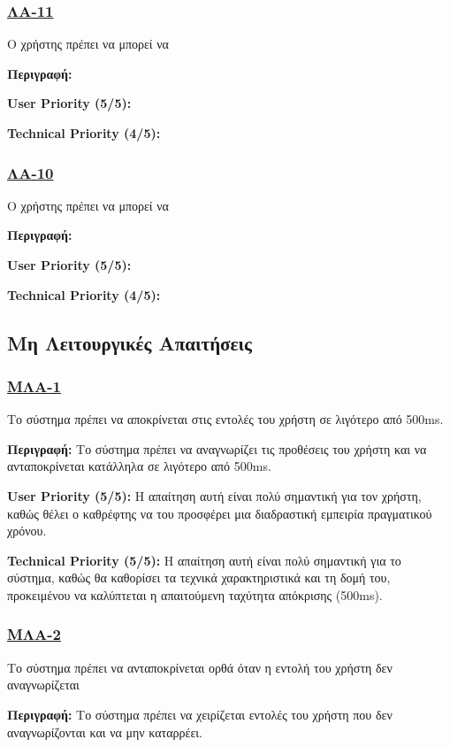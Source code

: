 \subsubsection{\underline{ΛΑ-11}}
\noindent Ο χρήστης πρέπει να μπορεί να

\noindent\textbf{Περιγραφή:}

\noindent\textbf{User Priority (5/5):}

\noindent\textbf{Technical Priority (4/5):}

\subsubsection{\underline{ΛΑ-10}}
\noindent Ο χρήστης πρέπει να μπορεί να

\noindent\textbf{Περιγραφή:}

\noindent\textbf{User Priority (5/5):}

\noindent\textbf{Technical Priority (4/5):}


\noindent\subsection{Μη Λειτουργικές Απαιτήσεις}

\subsubsection{\underline{ΜΛΑ-1}}
\noindent Το σύστημα πρέπει να αποκρίνεται στις εντολές του χρήστη σε λιγότερο από 500ms.

\noindent\textbf{Περιγραφή:} Το σύστημα πρέπει να αναγνωρίζει τις προθέσεις του χρήστη και να ανταποκρίνεται κατάλληλα σε λιγότερο από 500ms.

\noindent\textbf{User Priority (5/5):} Η απαίτηση αυτή είναι πολύ σημαντική για τον χρήστη, καθώς θέλει ο καθρέφτης να του προσφέρει μια διαδραστική εμπειρία πραγματικού χρόνου.

\noindent\textbf{Technical Priority (5/5):} Η απαίτηση αυτή είναι πολύ σημαντική για το σύστημα, καθώς θα καθορίσει τα τεχνικά χαρακτηριστικά και τη δομή του, προκειμένου να καλύπτεται η απαιτούμενη ταχύτητα απόκρισης (500ms).

\subsubsection{\underline{ΜΛΑ-2}}
\noindent Το σύστημα πρέπει να ανταποκρίνεται ορθά όταν η εντολή του χρήστη δεν αναγνωρίζεται

\noindent\textbf{Περιγραφή:} Το σύστημα πρέπει να χειρίζεται εντολές του χρήστη που δεν αναγνωρίζονται και να μην καταρρέει.

